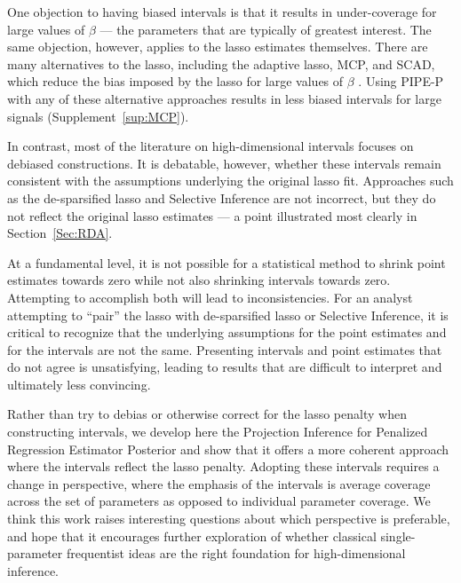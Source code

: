 One objection to having biased intervals is that it results in under-coverage for large values of $\beta$ --- the parameters that are typically of greatest interest. The same objection, however, applies to the lasso estimates themselves. There are many alternatives to the lasso, including the adaptive lasso, MCP, and SCAD, which reduce the bias imposed by the lasso for large values of $\beta$ \citep{Zou2006, Zhang2010, Fan2001}. Using PIPE-P with any of these alternative approaches results in less biased intervals for large signals (Supplement~\ref{sup:MCP}).

In contrast, most of the literature on high-dimensional intervals focuses on debiased constructions. It is debatable, however, whether these intervals remain consistent with the assumptions underlying the original lasso fit. Approaches such as the de-sparsified lasso and Selective Inference are not incorrect, but they do not reflect the original lasso estimates --- a point illustrated most clearly in Section~\ref{Sec:RDA}.

At a fundamental level, it is not possible for a statistical method to shrink point estimates towards zero while not also shrinking intervals towards zero. Attempting to accomplish both will lead to inconsistencies. For an analyst attempting to ``pair'' the lasso with de-sparsified lasso or Selective Inference, it is critical to recognize that the underlying assumptions for the point estimates and for the intervals are not the same. Presenting intervals and point estimates that do not agree is unsatisfying, leading to results that are difficult to interpret and ultimately less convincing.

Rather than try to debias or otherwise correct for the lasso penalty when constructing intervals, we develop here the Projection Inference for Penalized Regression Estimator Posterior and show that it offers a more coherent approach where the intervals reflect the lasso penalty. Adopting these intervals requires a change in perspective, where the emphasis of the intervals is average coverage across the set of parameters as opposed to individual parameter coverage. We think this work raises interesting questions about which perspective is preferable, and hope that it encourages further exploration of whether classical single-parameter frequentist ideas are the right foundation for high-dimensional inference.
